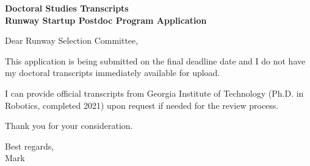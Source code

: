 \documentclass[11pt]{article}
\begin{document}
\begin{center}
\textbf{Doctoral Studies Transcripts}\\
\textbf{Runway Startup Postdoc Program Application}\\
\vspace{0.2in}
\end{center}

Dear Runway Selection Committee,

This application is being submitted on the final deadline date and I do not have my doctoral transcripts immediately available for upload. 

I can provide official transcripts from Georgia Institute of Technology (Ph.D. in Robotics, completed 2021) upon request if needed for the review process.

Thank you for your consideration.

\vspace{0.5in}

Best regards,\\
Mark
\end{document}
